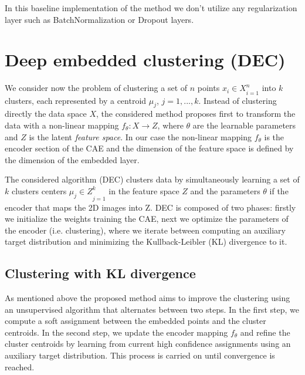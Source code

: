 
In this baseline implementation of the method we don't utilize any regularization layer such as BatchNormalization or Dropout layers.

\section{Deep embedded clustering (DEC)}

We consider now the problem of clustering a set of $n$ points ${x_i \in X}_{i=1}^n$ into $k$ clusters, each represented by a centroid $\mu_j$, $j = 1, ... , k$. Instead of clustering directly the data space $X$, the considered method proposes first to transform the data with a non-linear mapping $f_{\theta} : X \rightarrow Z$, where $\theta$ are the learnable parameters and $Z$ is the latent \textit{feature space}. In our case the non-linear mapping $f_{\theta}$ is the encoder section of the CAE and the dimension of the feature space is defined by the dimension of the embedded layer.

The considered algorithm (DEC) \cite{xie2016unsupervised} clusters data by simultaneously learning a set of $k$ clusters centers ${\mu_j \in Z}_{j=1}^k$ in the feature space $Z$ and the parameters $\theta$ if the encoder that maps the 2D images into Z. DEC is composed of two phases: firstly we initialize the weights training the CAE, next we optimize the parameters of the encoder (i.e. clustering), where we iterate between computing an auxiliary target distribution and minimizing the Kullback-Leibler (KL) divergence to it. 

\subsection{Clustering with KL divergence}

As mentioned above the proposed method aims to improve the clustering using an unsupervised algorithm that alternates between two steps. In the first step, we compute a soft assignment between the embedded points and the cluster centroids. In the second step, we update the encoder mapping $f_{\theta}$ and refine the cluster centroids by learning from current high confidence assignments using an auxiliary target distribution. This process is carried on until convergence is reached.

